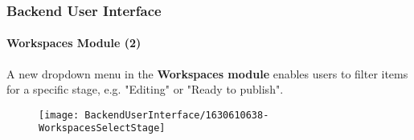 %

\begin{frame}[fragile]
	\frametitle{Backend User Interface}
	\framesubtitle{Workspaces Module (2)}

	A new dropdown menu in the \textbf{Workspaces module} enables users to filter
	items for a specific stage, e.g. "Editing" or "Ready to publish".

	\begin{figure}
		\texttt{[image: BackendUserInterface/1630610638-WorkspacesSelectStage]}
	\end{figure}

\end{frame}

